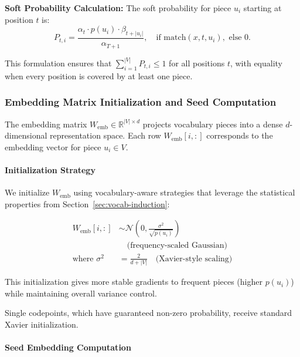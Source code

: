 \textbf{Soft Probability Calculation:} The soft probability for piece \(u_i\) starting at position \(t\) is:
\begin{equation}
P_{t,i} = \frac{\alpha_t \cdot p(u_i) \cdot \beta_{t + |u_i|}}{\alpha_{T+1}},
\quad \text{if } \text{match}(x, t, u_i), \text{ else } 0.
\label{eq:soft-probability}
\end{equation}

This formulation ensures that \(\sum_{i=1}^{|V|} P_{t,i} \leq 1\) for all positions \(t\), with equality when every position is covered by at least one piece.

\subsubsection{Embedding Matrix Initialization and Seed Computation}
\label{sec:seed-embeddings-computation}

The embedding matrix \(W_{\mathrm{emb}} \in \mathbb{R}^{|V| \times d}\) projects vocabulary pieces into a dense \(d\)-dimensional representation space. Each row \(W_{\mathrm{emb}}[i, :]\) corresponds to the embedding vector for piece \(u_i \in V\).

\paragraph{Initialization Strategy}

We initialize \(W_{\mathrm{emb}}\) using vocabulary-aware strategies that leverage the statistical properties from Section~\ref{sec:vocab-induction}:

\begin{align}
W_{\mathrm{emb}}[i, :] &\sim \mathcal{N}\left(0, \frac{\sigma^2}{\sqrt{p(u_i)}}\right) \\
&\quad \text{(frequency-scaled Gaussian)} \label{eq:freq-scaled-init} \\
\text{where } \sigma^2 &= \frac{2}{d + |V|} \quad \text{(Xavier-style scaling)} \label{eq:xavier-scaling}
\end{align}

This initialization gives more stable gradients to frequent pieces (higher \(p(u_i)\)) while maintaining overall variance control. 

Single codepoints, which have guaranteed non-zero probability, receive standard Xavier initialization.

\paragraph{Seed Embedding Computation}

